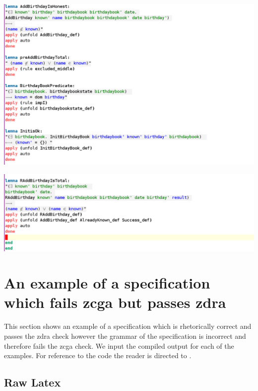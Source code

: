 \noindent \includegraphics[scale=0.4]{examples/bb/6imaged.png}

\noindent \includegraphics[scale=0.4]{examples/bb/6imagee.png}
%

\section{An example of a specification which fails \gls{zcga} but passes \gls{zdra}}
\label{app:nonworkingzcga}
This section shows an example of a specification which is rhetorically correct and passes the \gls{zdra} check however the grammar of the specification is incorrect and therefore fails the \gls{zcga} check. We input the compiled output for each of the examples. For reference to the code the reader is directed to \cite{mathlangexamples}.

\subsection{Raw Latex}

